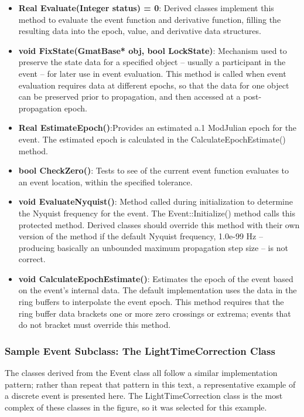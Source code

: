 \begin{itemize}
\item \textbf{Real Evaluate(Integer status) = 0}:  Derived classes implement this method to evaluate the event function and derivative function, filling the resulting data into the epoch, value, and derivative data structures.
\item \textbf{void FixState(GmatBase* obj, bool LockState)}:  Mechanism used to preserve the state data for a specified object -- usually a participant in the event -- for later use in event evaluation.  This method is called when event evaluation requires data at different epochs, so that the data for one object can be preserved prior to propagation, and then accessed at a post-propagation epoch.
\item \textbf{Real EstimateEpoch()}:Provides an estimated a.1 ModJulian epoch for the event.  The estimated epoch is calculated in the CalculateEpochEstimate() method.
\item \textbf{bool CheckZero()}:  Tests to see of the current event function evaluates to an event location, within the specified tolerance.
\item \textbf{void EvaluateNyquist()}:  Method called during initialization to determine the Nyquist frequency for the event.  The Event::Initialize() method calls this protected method.  Derived classes should override this method with their own version of the method if the default Nyquist frequency, 1.0e-99 Hz -- producing basically an unbounded maximum propagation step size -- is not correct.
\item \textbf{void CalculateEpochEstimate()}:  Estimates the epoch of the event based on the event's internal data.  The default implementation uses the data in the ring buffers to interpolate the event epoch.  This method requires that the ring buffer data brackets one or more zero crossings or extrema; events that do not bracket must override this method.
\end{itemize}

\subsubsection{Sample Event Subclass: The LightTimeCorrection Class}

The classes derived from the Event class all follow a similar implementation pattern; rather than repeat that pattern in this text, a representative example of a discrete event is presented here.  The LightTimeCorrection class is the most complex of these classes in the figure, so it was selected for this example.

